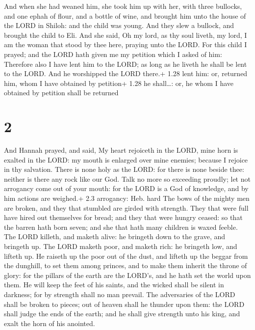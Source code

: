  And when she had weaned him, she took him up with her,
with three bullocks, and one ephah of flour, and a bottle of wine, and
brought him unto the house of the LORD in Shiloh: and the child was
young.  And they slew a bullock, and brought the child to
Eli.  And she said, Oh my lord, as thy soul liveth, my
lord, I am the woman that stood by thee here, praying unto the LORD.
 For this child I prayed; and the LORD hath given me my
petition which I asked of him:  Therefore also I have lent
him to the LORD; as long as he liveth he shall be lent to the LORD. And
he worshipped the LORD there.+ 1.28 lent him: or, returned him, whom I
have obtained by petition+ 1.28 he shall\ldots: or, he whom I have
obtained by petition shall be returned

\hypertarget{section-1}{%
\section{2}\label{section-1}}

 And Hannah prayed, and said, My heart rejoiceth in the
LORD, mine horn is exalted in the LORD: my mouth is enlarged over mine
enemies; because I rejoice in thy salvation.  There is none
holy as the LORD: for there is none beside thee: neither is there any
rock like our God.  Talk no more so exceeding proudly; let
not arrogancy come out of your mouth: for the LORD is a God of
knowledge, and by him actions are weighed.+ 2.3 arrogancy: Heb. hard
 The bows of the mighty men are broken, and they that
stumbled are girded with strength.  They that were full have
hired out themselves for bread; and they that were hungry ceased: so
that the barren hath born seven; and she that hath many children is
waxed feeble.  The LORD killeth, and maketh alive: he
bringeth down to the grave, and bringeth up.  The LORD
maketh poor, and maketh rich: he bringeth low, and lifteth up.
 He raiseth up the poor out of the dust, and lifteth up the
beggar from the dunghill, to set them among princes, and to make them
inherit the throne of glory: for the pillars of the earth are the
LORD's, and he hath set the world upon them.  He will keep
the feet of his saints, and the wicked shall be silent in darkness; for
by strength shall no man prevail.  The adversaries of the
LORD shall be broken to pieces; out of heaven shall he thunder upon
them: the LORD shall judge the ends of the earth; and he shall give
strength unto his king, and exalt the horn of his anointed.

